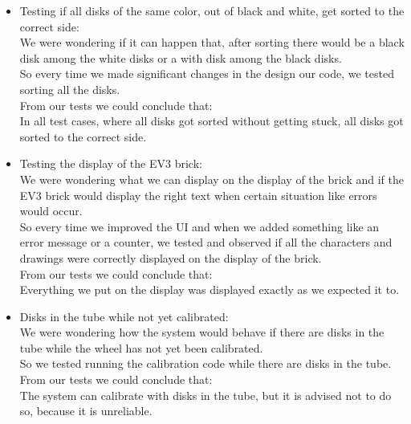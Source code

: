 \begin{itemize}
\item Testing if all disks of the same color, out of black and white, get sorted to the correct side:\\
We were wondering if it can happen that, after sorting there would be a black disk among the white disks or a with disk among the black disks.\\ 
So every time we made significant changes in the design our code, we tested sorting all the disks. \\
From our tests we could conclude that:\\
In all test cases, where all disks got sorted without getting stuck, all disks got sorted to the correct side.\\


\item Testing the display of the EV3 brick:\\
We were wondering what we can display on the display of the brick and if the EV3 brick would display the right text when certain situation like errors would occur.\\
So every time we improved the UI and when we added something like an error message or a counter, we tested and observed if all the characters and drawings were correctly displayed on the display of the brick.\\
From our tests we could conclude that:\\
Everything we put on the display was displayed exactly as we expected it to.\\


\item Disks in the tube while not yet calibrated:\\
We were wondering how the system would behave if there are disks in the tube while the wheel has not yet been calibrated.\\
So we tested running the calibration code while there are disks in the tube.\\
From our tests we could conclude that:\\
The system can calibrate with disks in the tube, but it is advised not to do so, because it is unreliable.\\



\end{itemize}
